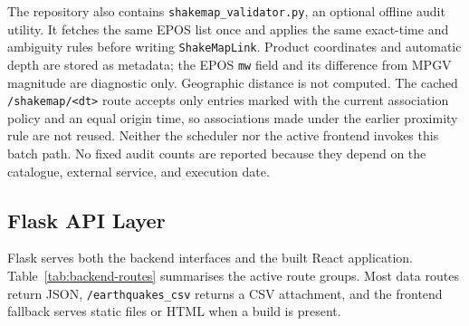 \documentclass[12pt]{article}
\begin{document}
The repository also contains \texttt{shakemap\_validator.py}, an optional offline audit utility. It fetches the same EPOS list once and applies the same exact-time and ambiguity rules before writing \texttt{ShakeMapLink}. Product coordinates and automatic depth are stored as metadata; the EPOS \texttt{mw} field and its difference from MPGV magnitude are diagnostic only. Geographic distance is not computed. The cached \texttt{/shakemap/<dt>} route accepts only entries marked with the current association policy and an equal origin time, so associations made under the earlier proximity rule are not reused. Neither the scheduler nor the active frontend invokes this batch path. No fixed audit counts are reported because they depend on the catalogue, external service, and execution date.

\subsection{Flask API Layer}

Flask serves both the backend interfaces and the built React application. Table~\ref{tab:backend-routes} summarises the active route groups. Most data routes return JSON, \texttt{/earthquakes\_csv} returns a CSV attachment, and the frontend fallback serves static files or HTML when a build is present.
\end{document}
